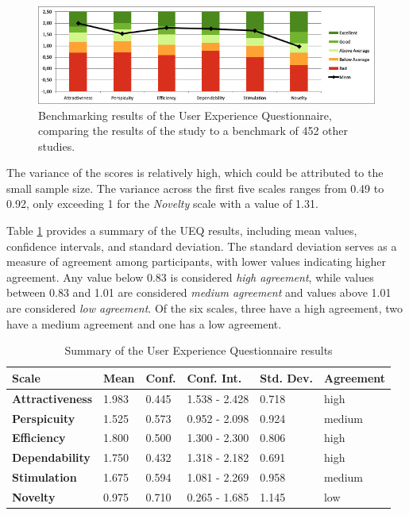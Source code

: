 \begin{figure}[htb]
	\includegraphics[width=\textwidth]{figures/ueq-2.png}
  \caption{Benchmarking results of the User Experience Questionnaire, comparing the results of the study to a benchmark of 452 other studies.}
  \label{fig:ueq-2}
\end{figure}

The variance of the scores is relatively high, which could be attributed to the small sample size.
The variance across the first five scales ranges from 0.49 to 0.92, only exceeding 1 for the \emph{Novelty} scale with a value of 1.31.

Table \ref{tab:ueq-summary} provides a summary of the UEQ results, including mean values, confidence intervals, and standard deviation.
The standard deviation serves as a measure of agreement among participants, with lower values indicating higher agreement.
Any value below 0.83 is considered \emph{high agreement}, while values between 0.83 and 1.01 are considered \emph{medium agreement} and values above 1.01 are considered \emph{low agreement}.
Of the six scales, three have a high agreement, two have a medium agreement and one has a low agreement.

\begin{table}[htb]
  \centering
  \begin{tabularx}{\textwidth}{|X|l|l|l|l|l|}
  \hline
      \textbf{Scale} &  \textbf{Mean}  &  \textbf{Conf.} &  \textbf{Conf. Int.} &  \textbf{Std. Dev.} & \textbf{Agreement}\\ \hline
      \textbf{Attractiveness} & 1.983  & 0.445 & 1.538 - 2.428 & 0.718 & high \\ \hline
      \textbf{Perspicuity} & 1.525 & 0.573 & 0.952 - 2.098 & 0.924 & medium\\ \hline
      \textbf{Efficiency} & 1.800 & 0.500 & 1.300 - 2.300 & 0.806 & high \\ \hline
      \textbf{Dependability} & 1.750 & 0.432 & 1.318 - 2.182 & 0.691 & high \\ \hline
      \textbf{Stimulation} & 1.675 & 0.594 & 1.081 - 2.269 & 0.958 & medium \\ \hline
      \textbf{Novelty} & 0.975 & 0.710 & 0.265 - 1.685 & 1.145 & low \\ \hline
  \end{tabularx}
  \vspace{6pt}
  \caption{Summary of the User Experience Questionnaire results}
  \label{tab:ueq-summary}
\end{table}

